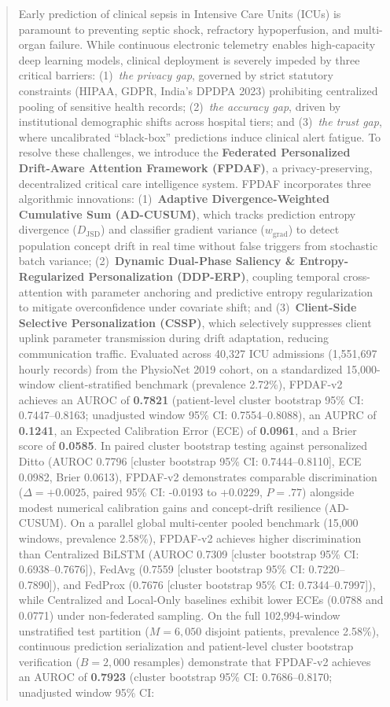 \documentclass[final,5p,times,twocolumn]{elsarticle}
\begin{document}
\begin{frontmatter}
\begin{abstract}
Early prediction of clinical sepsis in Intensive Care Units (ICUs) is paramount to preventing septic shock, refractory hypoperfusion, and multi-organ failure. While continuous electronic telemetry enables high-capacity deep learning models, clinical deployment is severely impeded by three critical barriers: (1)~\textit{the privacy gap}, governed by strict statutory constraints (HIPAA, GDPR, India's DPDPA 2023) prohibiting centralized pooling of sensitive health records; (2)~\textit{the accuracy gap}, driven by institutional demographic shifts across hospital tiers; and (3)~\textit{the trust gap}, where uncalibrated ``black-box'' predictions induce clinical alert fatigue. To resolve these challenges, we introduce the \textbf{Federated Personalized Drift-Aware Attention Framework (FPDAF)}, a privacy-preserving, decentralized critical care intelligence system. FPDAF incorporates three algorithmic innovations: (1)~\textbf{Adaptive Divergence-Weighted Cumulative Sum (AD-CUSUM)}, which tracks prediction entropy divergence ($D_{\text{JSD}}$) and classifier gradient variance ($w_{\text{grad}}$) to detect population concept drift in real time without false triggers from stochastic batch variance; (2)~\textbf{Dynamic Dual-Phase Saliency \& Entropy-Regularized Personalization (DDP-ERP)}, coupling temporal cross-attention with parameter anchoring and predictive entropy regularization to mitigate overconfidence under covariate shift; and (3)~\textbf{Client-Side Selective Personalization (CSSP)}, which selectively suppresses client uplink parameter transmission during drift adaptation, reducing communication traffic. Evaluated across 40,327 ICU admissions (1,551,697 hourly records) from the PhysioNet 2019 cohort, on a standardized 15,000-window client-stratified benchmark (prevalence 2.72\%), FPDAF-v2 achieves an AUROC of \textbf{0.7821} (patient-level cluster bootstrap 95\% CI: 0.7447--0.8163; unadjusted window 95\% CI: 0.7554--0.8088), an AUPRC of \textbf{0.1241}, an Expected Calibration Error (ECE) of \textbf{0.0961}, and a Brier score of \textbf{0.0585}. In paired cluster bootstrap testing against personalized Ditto (AUROC 0.7796 [cluster bootstrap 95\% CI: 0.7444--0.8110], ECE 0.0982, Brier 0.0613), FPDAF-v2 demonstrates comparable discrimination ($\Delta = +0.0025$, paired 95\% CI: -0.0193 to +0.0229, $P = .77$) alongside modest numerical calibration gains and concept-drift resilience (AD-CUSUM). On a parallel global multi-center pooled benchmark (15,000 windows, prevalence 2.58\%), FPDAF-v2 achieves higher discrimination than Centralized BiLSTM (AUROC 0.7309 [cluster bootstrap 95\% CI: 0.6938--0.7676]), FedAvg (0.7559 [cluster bootstrap 95\% CI: 0.7220--0.7890]), and FedProx (0.7676 [cluster bootstrap 95\% CI: 0.7344--0.7997]), while Centralized and Local-Only baselines exhibit lower ECEs (0.0788 and 0.0771) under non-federated sampling. On the full 102,994-window unstratified test partition ($M=6,050$ disjoint patients, prevalence 2.58\%), continuous prediction serialization and patient-level cluster bootstrap verification ($B=2,000$ resamples) demonstrate that FPDAF-v2 achieves an AUROC of \textbf{0.7923} (cluster bootstrap 95\% CI: 0.7686--0.8170; unadjusted window 95\% CI: 
\end{abstract}
\end{frontmatter}
\end{document}
